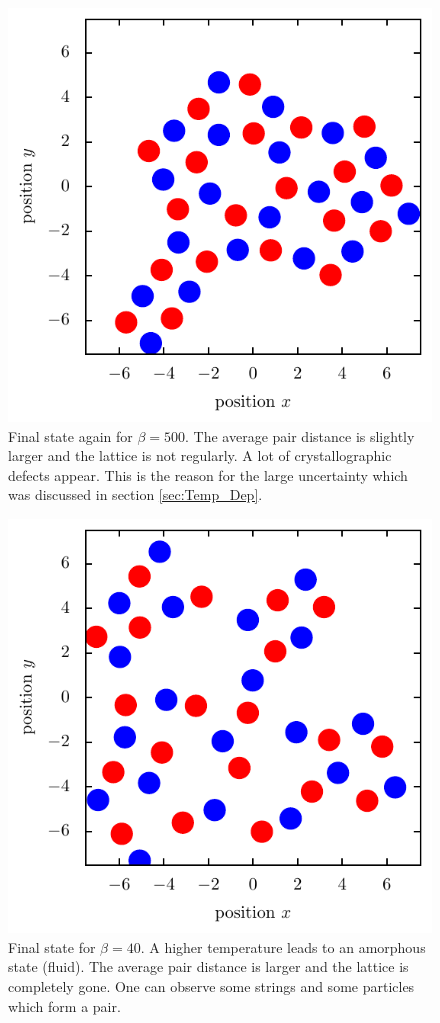 \documentclass[11pt, a4paper]{article}
\numberwithin{equation}{section}
\begin{document}
\begin{figure}[!h]
\centering
\includegraphics[scale=1]{figures/Kristall_4_beta_500.pdf}
\caption{Final state again for $\beta = 500$. 
The average pair distance is slightly larger and the lattice is not regularly.
A lot of crystallographic defects appear.
This is the reason for the large uncertainty which was discussed in section \ref{sec:Temp_Dep}.}
\end{figure}

\begin{figure}[!h]
\centering
\includegraphics[scale=1]{figures/Fluid_1_beta_40.pdf}
\caption{Final state for $\beta = 40$.
A higher temperature leads to an amorphous state (fluid).
The average pair distance is larger and the lattice is completely gone.
One can observe some strings and some particles which form a pair.}
\end{figure}
\end{document}
